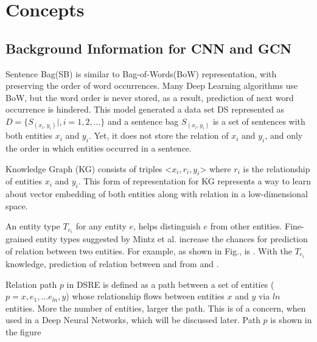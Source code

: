 \chapter{Concepts}
\label{ch:concepts}

\section{Background Information for CNN and GCN}
Sentence Bag(SB) is similar to Bag-of-Words(BoW) representation, with preserving the order of word occurrences. Many Deep Learning algorithms use BoW, but the word order is never stored, as a result, prediction of next word occurrence is hindered. This model generated a data set DS represented as $D = \{S_{(x_i,y_i)}|,i = 1,2,...\}$ and a sentence bag $S_{(x_i,y_i)}$ is a set of sentences with both entities $x_i$ and $y_i$. Yet, it does not store the relation of $x_i$ and $y_i$, and only the order in which entities occurred in a sentence.

\newpar
{}
Knowledge Graph (KG) consists of triples <$x_i, r_i, y_i$> where $r_i$ is the relationship of entities $x_i$ and $y_i$. This form of representation for KG represents a way to learn about vector embedding of both entities along with relation in a low-dimensional space. 

\newpar
{}
An entity type $T_{e_i}$ for any entity $e$, helps distinguish $e$ from other entities. Fine-grained entity types suggested by Mintz et al.\cite{mintz2009distant} increase the chances for prediction of relation between two entities.  For example, as shown in Fig.\cite{bibid},  is . With the $T_{e_i}$ knowledge, prediction of relation between  and  from  and .

\newpar
{}
Relation path $p$ in DSRE is defined as a path between a set of entities ($p = {x, e_1,...e_{ln}, y}$) whose relationship flows between entities $x$ and $y$ via $ln$ entities. More the number of entities, larger the path. This is of a concern, when used in a Deep Neural Networks, which will be discussed later. Path $p$ is shown in the figure\cite{bibid}





